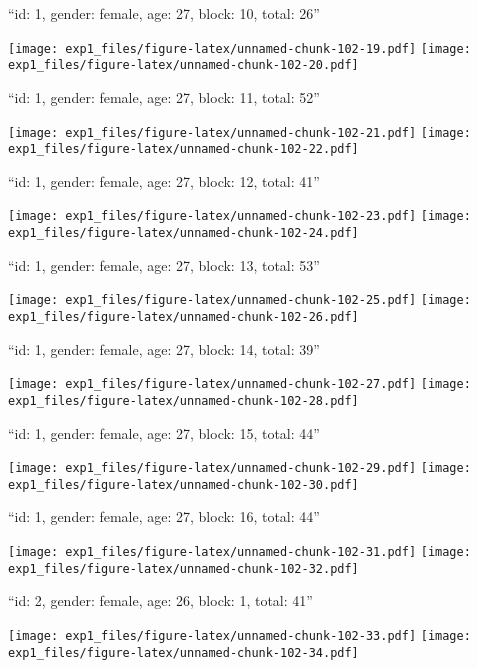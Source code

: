 \documentclass[11pt,,]{article}
\begin{document}
\newpage
[1] 

``id: 1, gender: female, age: 27, block: 10, total: 26''

\texttt{[image: exp1\_files/figure-latex/unnamed-chunk-102-19.pdf]}
\texttt{[image: exp1\_files/figure-latex/unnamed-chunk-102-20.pdf]}

\newpage
[1] 

``id: 1, gender: female, age: 27, block: 11, total: 52''

\texttt{[image: exp1\_files/figure-latex/unnamed-chunk-102-21.pdf]}
\texttt{[image: exp1\_files/figure-latex/unnamed-chunk-102-22.pdf]}

\newpage
[1] 

``id: 1, gender: female, age: 27, block: 12, total: 41''

\texttt{[image: exp1\_files/figure-latex/unnamed-chunk-102-23.pdf]}
\texttt{[image: exp1\_files/figure-latex/unnamed-chunk-102-24.pdf]}

\newpage
[1] 

``id: 1, gender: female, age: 27, block: 13, total: 53''

\texttt{[image: exp1\_files/figure-latex/unnamed-chunk-102-25.pdf]}
\texttt{[image: exp1\_files/figure-latex/unnamed-chunk-102-26.pdf]}

\newpage
[1] 

``id: 1, gender: female, age: 27, block: 14, total: 39''

\texttt{[image: exp1\_files/figure-latex/unnamed-chunk-102-27.pdf]}
\texttt{[image: exp1\_files/figure-latex/unnamed-chunk-102-28.pdf]}

\newpage
[1] 

``id: 1, gender: female, age: 27, block: 15, total: 44''

\texttt{[image: exp1\_files/figure-latex/unnamed-chunk-102-29.pdf]}
\texttt{[image: exp1\_files/figure-latex/unnamed-chunk-102-30.pdf]}

\newpage
[1] 

``id: 1, gender: female, age: 27, block: 16, total: 44''

\texttt{[image: exp1\_files/figure-latex/unnamed-chunk-102-31.pdf]}
\texttt{[image: exp1\_files/figure-latex/unnamed-chunk-102-32.pdf]}

\newpage
[1] 

``id: 2, gender: female, age: 26, block: 1, total: 41''

\texttt{[image: exp1\_files/figure-latex/unnamed-chunk-102-33.pdf]}
\texttt{[image: exp1\_files/figure-latex/unnamed-chunk-102-34.pdf]}
\end{document}
